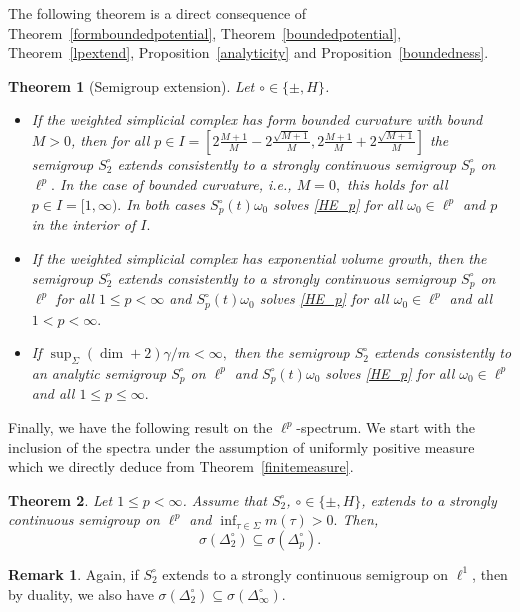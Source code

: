 \documentclass[10pt]{amsart}
\newtheorem{theorem}{Theorem}[section]
\theoremstyle{definition}
\newtheorem*{remark}{Remark}
\begin{document}
The following theorem is a direct consequence of Theorem~\ref{formboundedpotential}, Theorem~\ref{boundedpotential}, Theorem~\ref{lpextend}, Proposition~\ref{analyticity} and Proposition~\ref{boundedness}.   


\begin{theorem}[Semigroup extension]\label{semigroupextensioncomplexes} Let $\circ\in\{\pm,H\}$.
    \begin{itemize}
        \item[(a)] If the weighted simplicial complex has form bounded curvature with bound $M>0$, then for all  $p\in I =   [2\frac{M+1}{M}-2\frac{\sqrt{M+1}}{M},2\frac{M+1}{M}+2\frac{\sqrt{M+1}}{M}]$ the semigroup $S_2^\circ$ extends consistently to a strongly continuous semigroup $S_p^\circ$ on $\ell^p.$ In the case of bounded curvature, i.e., $M=0,$ this holds for all $p\in I = [1,\infty).$ In both cases $S_p^\circ(t)\omega_0$ solves \eqref{HE_p} for all  $\omega_0\in\ell^p$ and $p$ in the interior of $I.$
        \item[(b)] If the weighted simplicial complex has exponential volume growth, then the semigroup $S_2^\circ$ extends consistently to a strongly continuous semigroup $S_p^\circ$ on $\ell^p$ for all $1\leq p< \infty$ and $S_p^\circ(t)\omega_0$ solves \eqref{HE_p} for all  $\omega_0\in\ell^p$ and  all $1<p<\infty.$
        \item [(c)]If $\sup_\Sigma(\dim+2)\gamma\slash m<\infty,$ then the semigroup $S^\circ_2$ extends consistently to an analytic semigroup $S^\circ_p$ on $\ell^p$  and $S_p^\circ(t)\omega_0$ solves \eqref{HE_p} for  all  $\omega_0\in\ell^p$ and all $1\leq p\leq\infty.$
    \end{itemize}
\end{theorem}

Finally, we have the following result on the  $\ell^p$-spectrum. We start with the inclusion of the spectra under the assumption of uniformly positive measure which we directly deduce from Theorem~\ref{finitemeasure}.

\begin{theorem}\label{finitemeasureSC} Let  $ 1\leq p< \infty $. Assume that  $ S_{2} ^\circ$, $\circ\in\{\pm,H\}$, extends to a strongly continuous semigroup on $ \ell^{p} $  and  $\inf_{\tau\in \Sigma} m(\tau)>0.$ Then,
    \[\sigma( \Delta^\circ_2)\subseteq\sigma( \Delta^\circ_p).\]
\end{theorem}

\begin{remark}
  Again,  if $S_2^{\circ}$ extends to a strongly continuous semigroup on $\ell^1$, then by duality, we also have
    $\sigma( \Delta_2^{\circ})\subseteq  \sigma( \Delta^{\circ}_\infty) .$
\end{remark}
\end{document}
